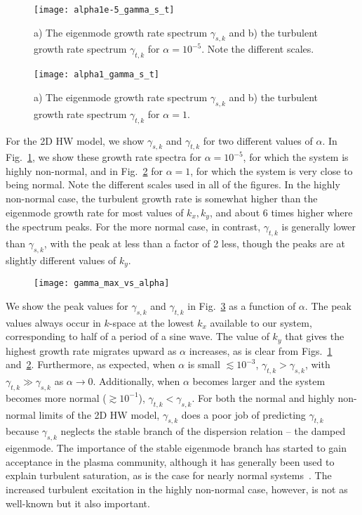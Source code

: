\documentclass[letter,scriptaddress,twocolumn, prl,showkeys]{revtex4}
\begin{document}
\begin{figure}
\centerline{\texttt{[image: alpha1e-5\_gamma\_s\_t]}}
\caption{a) The eigenmode growth rate spectrum $\gamma_{s,k}$ and b) the turbulent growth rate spectrum $\gamma_{t,k}$ for $\alpha = 10^{-5}$. Note the different scales.}
\label{alpha1e-5_gamma_s_t}
\end{figure}

\begin{figure}
\centerline{\texttt{[image: alpha1\_gamma\_s\_t]}}
\caption{a) The eigenmode growth rate spectrum $\gamma_{s,k}$ and b) the turbulent growth rate spectrum $\gamma_{t,k}$ for $\alpha = 1$.}
\label{alpha1_gamma_s_t}
\end{figure}

For the 2D HW model, we show
$\gamma_{s,k}$ and $\gamma_{t,k}$ for two different values of $\alpha$. In Fig.~\ref{alpha1e-5_gamma_s_t}, we show these growth rate spectra for $\alpha = 10^{-5}$, for which the system is
highly non-normal, and in Fig.~\ref{alpha1_gamma_s_t} for $\alpha = 1$, for which the system is very close to being normal. Note the different scales used in all of the figures. In the highly
non-normal case, the turbulent growth rate is somewhat higher than the eigenmode growth rate for most values of $k_x,k_y$, and about 6 times higher where the spectrum peaks. For the more normal
case, in contrast, $\gamma_{t,k}$ is generally lower than $\gamma_{s,k}$, with the peak at less than a factor of 2 less, though the peaks are at slightly different values of $k_y$.

\begin{figure}
\centerline{\texttt{[image: gamma\_max\_vs\_alpha]}}
\caption{}
\label{gamma_max_vs_alpha}
\end{figure}

We show the peak values for $\gamma_{s,k}$ and $\gamma_{t,k}$ in Fig.~\ref{gamma_max_vs_alpha} as a function of $\alpha$. The peak values always occur in $k$-space
at the lowest $k_x$ available to our system, corresponding to half of a period of a sine wave. The value of $k_y$ that gives the highest growth rate migrates upward as $\alpha$ increases,
as is clear from Figs.~\ref{alpha1e-5_gamma_s_t} and~\ref{alpha1_gamma_s_t}. Furthermore, as expected, when $\alpha$ is small $\lesssim 10^{-3}$, $\gamma_{t,k} > \gamma_{s,k}$, with
$\gamma_{t,k} \gg \gamma_{s,k}$ as $\alpha \to 0$. Additionally, when $\alpha$ becomes larger and the system becomes more normal ($\gtrsim 10^{-1}$), $\gamma_{t,k} < \gamma_{s,k}$.
For both the normal and highly non-normal limits of the 2D HW model, $\gamma_{s,k}$ does a poor job of predicting $\gamma_{t,k}$ because $\gamma_{s,k}$ neglects the stable branch of the
dispersion relation -- the damped eigenmode. The importance of the stable eigenmode branch has started to gain acceptance in the plasma community, although it has generally been used to explain
turbulent saturation, as is the case for nearly normal systems~\cite{terry2006}. The increased turbulent excitation in the highly non-normal case, however, is not as well-known but it also
important.
\end{document}
